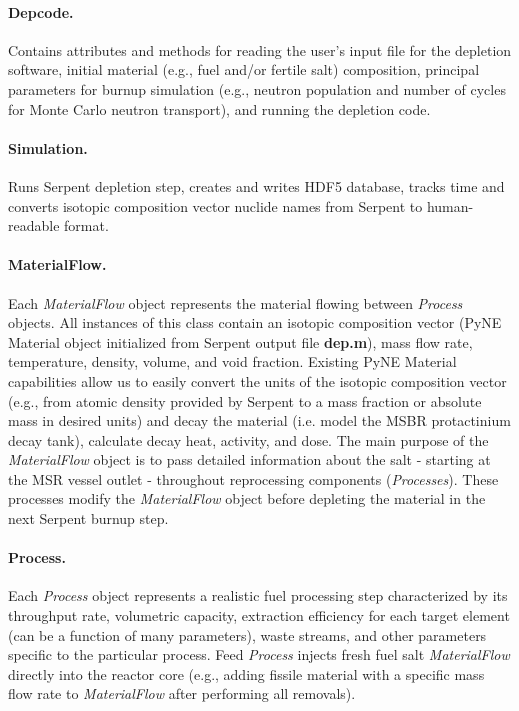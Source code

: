 \documentclass[12pt]{article} %
\begin{document}
	\paragraph{Depcode.}Contains attributes and methods for 
	reading the user's input file for the depletion software, initial material 
	(e.g., fuel and/or fertile salt) composition, principal parameters for  
	burnup simulation (e.g., neutron population and number of cycles for Monte 
	Carlo neutron transport), and running the depletion code.
	\paragraph{Simulation.} Runs Serpent depletion step, creates and writes 
	HDF5 database, tracks time and converts isotopic composition vector 
	nuclide names from Serpent to human-readable format.
	\paragraph{MaterialFlow.}Each \textit{MaterialFlow} object represents the 
	material flowing between \textit{Process} objects. All instances of this 
	class contain an isotopic composition vector (PyNE Material object  
	initialized from Serpent output file \textbf{dep.m}), mass flow rate, 
	temperature, density, volume, and void fraction. Existing PyNE Material 
	capabilities allow us to easily convert the units of the isotopic 
	composition vector (e.g., from atomic density provided by Serpent to 
	a mass fraction or absolute mass in desired units) and decay the material 
	(i.e. model the \gls{MSBR} protactinium decay tank), calculate decay heat, 
	activity, and dose. The main purpose of the \textit{MaterialFlow} object 
	is to pass detailed information about the salt - starting at the \gls{MSR} 
	vessel outlet - throughout reprocessing components 
	(\textit{Processes}). These processes modify the \textit{MaterialFlow} 
	object before depleting the material in the next Serpent burnup step.
	\paragraph{Process.}Each \textit{Process} object represents a 
	realistic fuel processing step characterized by its throughput rate, 
	volumetric capacity, extraction efficiency for each target element (can be 
	a function of many parameters), waste streams, and other parameters 
	specific to the particular process. Feed \textit{Process} injects fresh 
	fuel salt \textit{MaterialFlow} directly into the reactor core (e.g., 
	adding fissile material with a specific mass flow rate to  
	\textit{MaterialFlow} after performing all removals).
\end{document}

